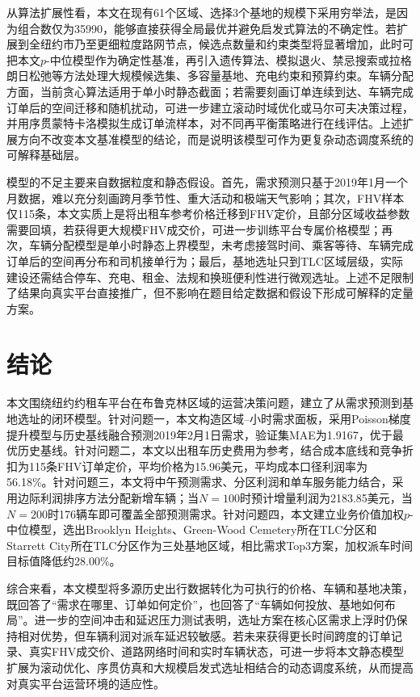 \documentclass[UTF8,a4paper,12pt]{ctexart}
\begin{document}
从算法扩展性看，本文在现有61个区域、选择3个基地的规模下采用穷举法，是因为组合数仅为35990，能够直接获得全局最优并避免启发式算法的不确定性。若扩展到全纽约市乃至更细粒度路网节点，候选点数量和约束类型将显著增加，此时可把本文$p$-中位模型作为确定性基准，再引入遗传算法、模拟退火、禁忌搜索或拉格朗日松弛等方法处理大规模候选集、多容量基地、充电约束和预算约束。车辆分配方面，当前贪心算法适用于单小时静态截面；若需要刻画订单连续到达、车辆完成订单后的空间迁移和随机扰动，可进一步建立滚动时域优化或马尔可夫决策过程，并用序贯蒙特卡洛模拟生成订单流样本，对不同再平衡策略进行在线评估。上述扩展方向不改变本文基准模型的结论，而是说明该模型可作为更复杂动态调度系统的可解释基础层。

模型的不足主要来自数据粒度和静态假设。首先，需求预测只基于2019年1月一个月数据，难以充分刻画跨月季节性、重大活动和极端天气影响；其次，FHV样本仅115条，本文实质上是将出租车参考价格迁移到FHV定价，且部分区域收益参数需要回填，若获得更大规模FHV成交价，可进一步训练平台专属价格模型；再次，车辆分配模型是单小时静态上界模型，未考虑接驾时间、乘客等待、车辆完成订单后的空间再分布和司机接单行为；最后，基地选址只到TLC区域层级，实际建设还需结合停车、充电、租金、法规和换班便利性进行微观选址。上述不足限制了结果向真实平台直接推广，但不影响在题目给定数据和假设下形成可解释的定量方案。


\clearpage
\section{结论}
本文围绕纽约约租车平台在布鲁克林区域的运营决策问题，建立了从需求预测到基地选址的闭环模型。针对问题一，本文构造区域--小时需求面板，采用Poisson梯度提升模型与历史基线融合预测2019年2月1日需求，验证集MAE为1.9167，优于最优历史基线。针对问题二，本文以出租车历史费用为参考，结合成本底线和竞争折扣为115条FHV订单定价，平均价格为15.96美元，平均成本口径利润率为56.18\%。针对问题三，本文将中午预测需求、分区利润和单车服务能力结合，采用边际利润排序方法分配新增车辆；当$N=100$时预计增量利润为2183.85美元，当$N=200$时176辆车即可覆盖全部预测需求。针对问题四，本文建立业务价值加权$p$-中位模型，选出Brooklyn Heights、Green-Wood Cemetery所在TLC分区和Starrett City所在TLC分区作为三处基地区域，相比需求Top3方案，加权派车时间目标值降低约28.00\%。

综合来看，本文模型将多源历史出行数据转化为可执行的价格、车辆和基地决策，既回答了“需求在哪里、订单如何定价”，也回答了“车辆如何投放、基地如何布局”。进一步的空间冲击和延迟压力测试表明，选址方案在核心区需求上浮时仍保持相对优势，但车辆利润对派车延迟较敏感。若未来获得更长时间跨度的订单记录、真实FHV成交价、道路网络时间和实时车辆状态，可进一步将本文静态模型扩展为滚动优化、序贯仿真和大规模启发式选址相结合的动态调度系统，从而提高对真实平台运营环境的适应性。
\end{document}
